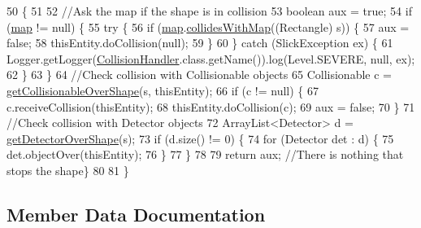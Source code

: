 \begin{DoxyCode}
50                                                                        \{
51 
52         \textcolor{comment}{//Ask the map if the shape is in collision}
53         \textcolor{keywordtype}{boolean} aux = \textcolor{keyword}{true};
54         \textcolor{keywordflow}{if} (\mbox{\hyperlink{classentities_1_1_collision_handler_a2490d8412bb72d221dd9f68f97565e6f}{map}} != null) \{
55             \textcolor{keywordflow}{try} \{
56                 \textcolor{keywordflow}{if} (\mbox{\hyperlink{classentities_1_1_collision_handler_a2490d8412bb72d221dd9f68f97565e6f}{map}}.\mbox{\hyperlink{classentities_1_1_map_a0dadc6784b338c8aa26adb95568e75fb}{collidesWithMap}}((Rectangle) s)) \{
57                     aux = \textcolor{keyword}{false};
58                     thisEntity.doCollision(null);
59                 \}
60             \} \textcolor{keywordflow}{catch} (SlickException ex) \{
61                 Logger.getLogger(\mbox{\hyperlink{classentities_1_1_collision_handler_ad94181e30c3d06d9d78d8244cc151c7a}{CollisionHandler}}.class.getName()).log(Level.SEVERE, null, 
      ex);
62             \}
63         \}
64         \textcolor{comment}{//Check collision with Collisionable objects}
65         Collisionable c = \mbox{\hyperlink{classentities_1_1_collision_handler_a55c5a015e29edac05c725108e3d481f2}{getCollisionableOverShape}}(s, thisEntity);
66         \textcolor{keywordflow}{if} (c != null) \{
67             c.receiveCollision(thisEntity);
68             thisEntity.doCollision(c);
69             aux = \textcolor{keyword}{false};
70         \}
71         \textcolor{comment}{//Check collision with Detector objects}
72         ArrayList<Detector> d = \mbox{\hyperlink{classentities_1_1_collision_handler_ac09d2b1b7fff6e7dd141d09322beb922}{getDetectorOverShape}}(s);
73         \textcolor{keywordflow}{if} (d.size() != 0) \{
74             \textcolor{keywordflow}{for} (Detector det : d) \{
75                 det.objectOver(thisEntity);
76             \}
77         \}
78 
79         \textcolor{keywordflow}{return} aux;    \textcolor{comment}{//There is nothing that stops the shape\}}
80 
81     \}
\end{DoxyCode}


\subsection{Member Data Documentation}
\mbox{\label{classentities_1_1_collision_handler_a4ab7151e81e4b5e7e5bd99bf72f2dc3a}} 
